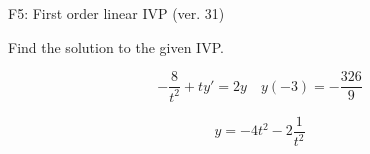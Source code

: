 \begin{exercise}
  \begin{exerciseTitle}F5: First order linear IVP (ver. 31)\end{exerciseTitle}
  \begin{exerciseStatement}
    
Find the solution to the given IVP.

    
\[-\frac{8}{t^{2}} +ty'= 2 y \hspace{1em} y( -3 ) = -\frac{326}{9}\]

  \end{exerciseStatement}
  \begin{exerciseAnswer}
    
\[y= -4 t^ 2 -2 \frac{1}{t^{2}}\]

  \end{exerciseAnswer}
\end{exercise}